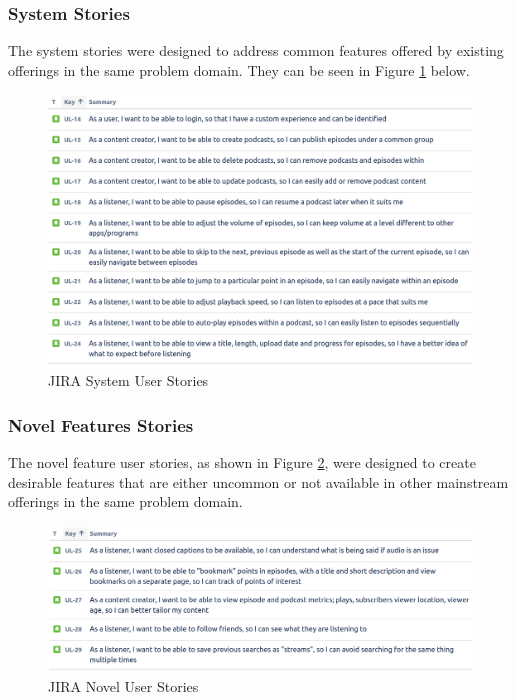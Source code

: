 \documentclass[12pt]{article}
\begin{document}
\subsubsection{System Stories} \label{sec:system_stories}

The system stories were designed to address common features offered by existing offerings in the same problem domain. 
They can be seen in Figure \ref{fig:jira_system_user_stories} below.

\begin{figure}[ht]
    \centering
    \includegraphics[width=\textwidth]{resources/system_stories}
    \caption{JIRA System User Stories}
    \label{fig:jira_system_user_stories}
\end{figure}

\subsubsection{Novel Features Stories} \label{sec:novel_features_stories}

The novel feature user stories, as shown in Figure \ref{fig:jira_novel_user_stories}, were designed to create desirable features that are either uncommon or not 
available in other mainstream offerings in the same problem domain.

\begin{figure}[ht]
    \centering
    \includegraphics[width=\textwidth]{resources/novel_stories}
    \caption{JIRA Novel User Stories}
    \label{fig:jira_novel_user_stories}
\end{figure}
\end{document}
